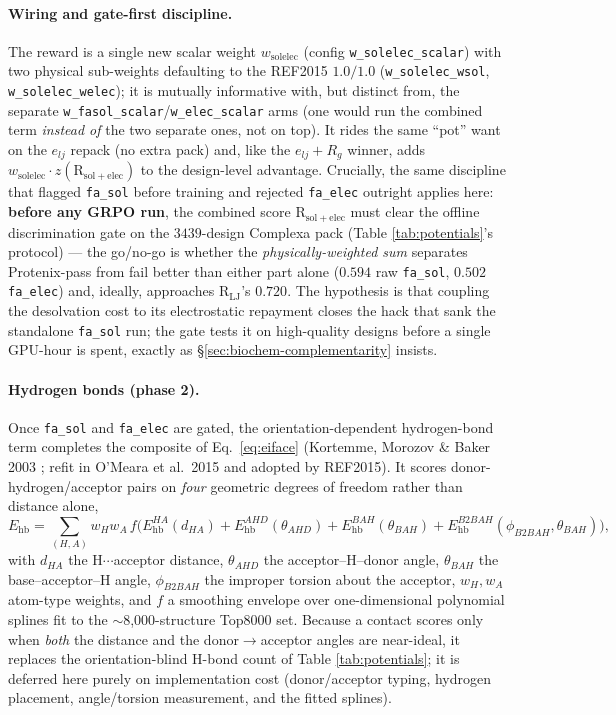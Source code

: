 \documentclass[11pt]{article}
\newcommand{\R}{\mathrm{R}}
\newcommand{\ttk}[1]{\texttt{\small #1}}
\begin{document}
\paragraph{Wiring and gate-first discipline.} The reward is a single new scalar weight
$w_{\mathrm{solelec}}$ (config \ttk{w\_solelec\_scalar}) with two physical sub-weights defaulting to
the REF2015 $1.0/1.0$ (\ttk{w\_solelec\_wsol}, \ttk{w\_solelec\_welec}); it is mutually informative
with, but distinct from, the separate \ttk{w\_fasol\_scalar}/\ttk{w\_elec\_scalar} arms (one would run
the combined term \emph{instead of} the two separate ones, not on top). It rides the same ``pot'' want
on the $e_{lj}$ repack (no extra pack) and, like the $e_{lj}+R_g$ winner, adds
$w_{\mathrm{solelec}}\cdot z(\R_{\mathrm{sol+elec}})$ to the design-level advantage. Crucially, the
same discipline that flagged \ttk{fa\_sol} before training and rejected \ttk{fa\_elec} outright applies
here: \textbf{before any GRPO run}, the combined score
$\R_{\mathrm{sol+elec}}$ must clear the offline discrimination gate on the $3439$-design Complexa pack
(Table \ref{tab:potentials}'s protocol) --- the go/no-go is whether the \emph{physically-weighted sum}
separates Protenix-pass from fail better than either part alone ($0.594$ raw \ttk{fa\_sol}, $0.502$
\ttk{fa\_elec}) and, ideally, approaches $\R_{\mathrm{LJ}}$'s $0.720$. The hypothesis is that coupling
the desolvation cost to its electrostatic repayment closes the hack that sank the standalone
\ttk{fa\_sol} run; the gate tests it on high-quality designs before a single GPU-hour is spent, exactly
as \S\ref{sec:biochem-complementarity} insists.

\paragraph{Hydrogen bonds (phase 2).} Once \ttk{fa\_sol} and \ttk{fa\_elec} are gated, the
orientation-dependent hydrogen-bond term completes the composite of Eq.\ \ref{eq:eiface} (Kortemme,
Morozov \& Baker 2003 \cite{kortemme2003}; refit in O'Meara et al.\ 2015 \cite{omeara2015} and
adopted by REF2015). It scores donor-hydrogen/acceptor pairs on \emph{four} geometric degrees of
freedom rather than distance alone,
\[
E_{\mathrm{hb}}=\!\!\sum_{(H,A)}\!\! w_H w_A\,f\!\Big(
   E_{\mathrm{hb}}^{HA}(d_{HA})+E_{\mathrm{hb}}^{AHD}(\theta_{AHD})
  +E_{\mathrm{hb}}^{BAH}(\theta_{BAH})+E_{\mathrm{hb}}^{B2BAH}(\phi_{B2BAH},\theta_{BAH})\Big),
\]
with $d_{HA}$ the H$\cdots$acceptor distance, $\theta_{AHD}$ the acceptor--H--donor angle,
$\theta_{BAH}$ the base--acceptor--H angle, $\phi_{B2BAH}$ the improper torsion about the acceptor,
$w_H,w_A$ atom-type weights, and $f$ a smoothing envelope over one-dimensional polynomial splines fit
to the $\sim$8{,}000-structure Top8000 set. Because a contact scores only when \emph{both} the
distance and the donor$\rightarrow$acceptor angles are near-ideal, it replaces the orientation-blind
H-bond count of Table \ref{tab:potentials}; it is deferred here purely on implementation cost
(donor/acceptor typing, hydrogen placement, angle/torsion measurement, and the fitted splines).
\end{document}
